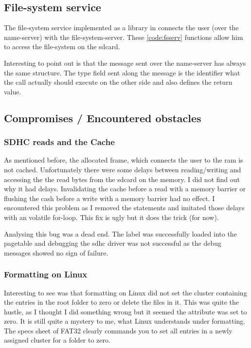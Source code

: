 \subsection{File-system service}
The file-system service implemented as a library in  connects the user (over the name-server) with the file-system-server. These \ref{code:fsserv} functions allow him to access the file-system on the sdcard. 

Interesting to point out is that the message sent over the name-server has always the same structure. The type field sent along the message is the identifier what the call actually should execute on the other side and also defines the return value.  

\subsection{Compromises / Encountered obstacles}
\label{subsec:comp}

\subsubsection{SDHC reads and the Cache}
As mentioned before, the allocated frame, which connects the user to the ram is not cached. Unfortunately there were some delays between reading/writing and accessing the the read bytes from the sdcard on the memory. I did not find out why it had delays. Invalidating the cache before a read with a memory barrier or flushing the cash before a write with a memory barrier had no effect. 
I encountered this problem as I removed the  statements and imitated those delays with an volatile for-loop. This fix is ugly but it does the trick (for now).


Analysing this bug was a dead end. The label  was successfully loaded into the pagetable and debugging the sdhc driver was not successful as the debug messages showed no sign of failure.

\subsubsection{Formatting on Linux}
Interesting to see was that formatting on Linux did not set the cluster containing the entries in the root folder to zero or delete the files in it. This was quite the hustle, as I thought I did something wrong but it seemed the attribute was set to zero. It is still quite a mystery to me, what Linux understands under formatting. The specs sheet of FAT32 clearly commands you to set all entries in a newly assigned cluster for a folder to zero.

